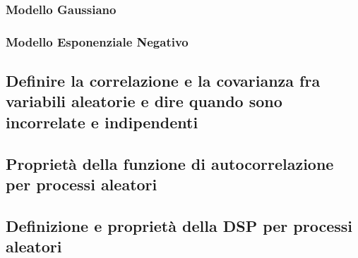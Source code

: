 \documentclass[12pt,oneside,openany]{memoir}
\numberwithin{equation}{subsection}
\begin{document}

\subsubsection{Modello Gaussiano}


\subsubsection{Modello Esponenziale Negativo}


\newpage
\subsection{Definire la correlazione e la covarianza fra variabili aleatorie e
dire quando sono incorrelate e indipendenti}


\newpage
\subsection{Propriet\`a della funzione di autocorrelazione per processi
aleatori}


\newpage
\subsection{Definizione e propriet\`a della DSP per processi aleatori}
\end{document}
